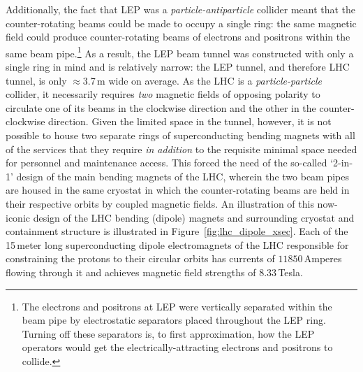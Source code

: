 Additionally, the fact that LEP was a \textit{particle-antiparticle} collider meant that the counter-rotating
beams could be made to occupy a single ring: the same magnetic field could produce counter-rotating beams of
electrons and positrons within the same beam pipe.\footnote{The electrons and positrons at LEP were vertically separated
within the beam pipe by electrostatic separators placed throughout the LEP ring. Turning off these separators
is, to first approximation, how the LEP operators would get the electrically-attracting electrons and positrons to collide.}
As a result, the LEP beam tunnel was constructed with only a single ring in mind and is relatively narrow: the LEP tunnel,
and therefore LHC tunnel, is only $\approx$3.7\,m wide on average.
As the LHC is a \textit{particle-particle} collider, it necessarily requires \textit{two} magnetic fields
of opposing polarity to circulate one of its beams in the clockwise direction and the other in the
counter-clockwise direction.
Given the limited space in the tunnel, however, it is not possible to house two separate rings
of superconducting bending magnets with all of the services that they require \textit{in addition} to the requisite
minimal space needed for personnel and maintenance access.
This forced the need of the so-called `2-in-1' design of the main bending magnets of the LHC, wherein the two
beam pipes are housed in the same cryostat in which the counter-rotating beams are held in their
respective orbits by coupled magnetic fields.
An illustration of this now-iconic design of the LHC bending (dipole) magnets and surrounding cryostat and containment structure is illustrated in Figure~\ref{fig:lhc_dipole_xsec}.
Each of the 15\,meter long superconducting dipole electromagnets of the LHC responsible for constraining the protons to their circular
orbits has currents of $11850$\,Amperes flowing through it and achieves magnetic field strengths of $8.33$\,Tesla.

